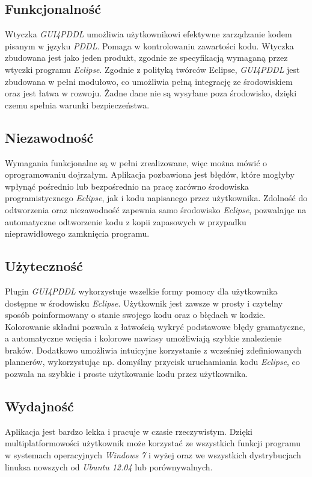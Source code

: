 \subsection{Funkcjonalność}
Wtyczka \emph{GUI4PDDL} umożliwia użytkownikowi efektywne zarządzanie kodem pisanym w języku \emph{PDDL}. Pomaga w kontrolowaniu zawartości kodu. Wtyczka zbudowana jest jako jeden produkt, zgodnie ze specyfikacją wymaganą przez wtyczki programu \emph{Eclipse}. Zgodnie z polityką twórców Eclipse, \emph{GUI4PDDL} jest zbudowana w pełni modułowo, co umożliwia pełną integrację ze środowiskiem oraz jest łatwa w rozwoju. Żadne dane nie są wysyłane poza środowisko, dzięki czemu spełnia warunki bezpieczeństwa.
\subsection{Niezawodność}
Wymagania funkcjonalne są w pełni zrealizowane, więc można mówić o oprogramowaniu dojrzałym. Aplikacja pozbawiona jest błędów, które mogłyby wpłynąć pośrednio lub bezpośrednio na pracę zarówno środowiska programistycznego \emph{Eclipse}, jak i kodu napisanego przez użytkownika. Zdolność do odtworzenia oraz niezawodność zapewnia samo środowisko \emph{Eclipse}, pozwalając na automatyczne odtworzenie kodu z kopii zapasowych w przypadku nieprawidłowego zamknięcia programu.
\subsection{Użyteczność}
Plugin \emph{GUI4PDDL} wykorzystuje wszelkie formy pomocy dla użytkownika dostępne w środowisku \emph{Eclipse}. Użytkownik jest zawsze w prosty i czytelny sposób poinformowany o stanie swojego kodu oraz o błędach w kodzie. Kolorowanie składni pozwala z łatwością wykryć podstawowe błędy gramatyczne, a automatyczne wcięcia i kolorowe nawiasy umożliwiają szybkie znalezienie braków. Dodatkowo umożliwia intuicyjne korzystanie z wcześniej zdefiniowanych plannerów, wykorzystując np. domyślny przycisk uruchamiania kodu \emph{Eclipse}, co pozwala na szybkie i proste użytkowanie kodu przez użytkownika.
\subsection{Wydajność}
Aplikacja jest bardzo lekka i pracuje w czasie rzeczywistym. Dzięki multiplatformowości użytkownik może korzystać ze wszystkich funkcji programu w systemach operacyjnych \emph{Windows 7} i wyżej oraz we wszystkich dystrybucjach linuksa nowszych od \emph{Ubuntu 12.04} lub porównywalnych.
